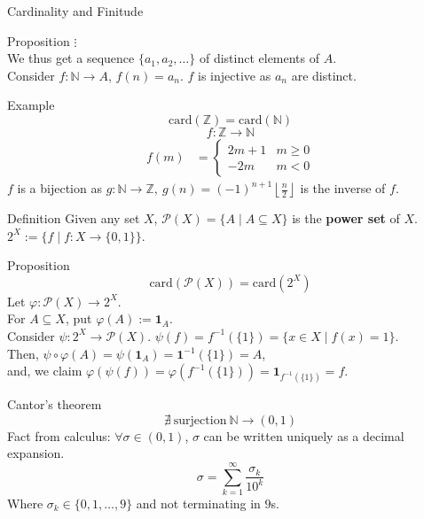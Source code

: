 \documentclass[8pt]{extarticle}
\begin{document}
\begin{problem}{Cardinality and Finitude}
\begin{problem}{Proposition}
      $\vdots$\\

      We thus get a sequence $\{a_1,a_2,\dots\}$ of distinct elements of $A$.\\

      Consider $f:\mathbb{N} \rightarrow A$, $f(n) = a_n$. $f$ is injective as $a_n$ are distinct.
    \end{problem}
    \begin{problem}{Example}
      \[
        \textrm{card}(\mathbb{Z}) = \textrm{card}(\mathbb{N})
      \] 
      \tcblower
      \[
        f:\mathbb{Z} \rightarrow \mathbb{N}
      \] 
      \begin{align*}
        f(m) &= \begin{cases}
          2m + 1 & m\geq 0\\
          -2m & m<0
        \end{cases}
      \end{align*}
      $f$ is a bijection as $g:\mathbb{N} \rightarrow \mathbb{Z},~g(n) = (-1)^{n+1}\left\lfloor \frac{n}{2}\right\rfloor$ is the inverse of $f$.
    \end{problem}
    \begin{problem}{Definition}
      Given any set $X$, $\mathcal{P}(X) = \{A \mid A\subseteq X\}$ is the \textbf{power set} of $X$.\\

      $2^X:= \{f\mid f:X\rightarrow \{0,1\}\}$.
    \end{problem}
    \begin{problem}{Proposition}
      \[
        \textrm{card}(\mathcal{P}(X)) = \textrm{card}(2^X)
      \] 
      \tcblower
      Let $\varphi: \mathcal{P}(X) \rightarrow 2^X$.\\

      For $A\subseteq X$, put $\varphi(A) := \mathbf{1}_A$.\\

      Consider $\psi: 2^X \rightarrow \mathcal{P}(X)$. $\psi(f) = f^{-1}(\{1\}) = \{x\in X \mid f(x) = 1\}$.\\

      Then, $\psi\circ\varphi(A) = \psi(\mathbf{1}_A) = \mathbf{1}^{-1}(\{1\}) = A$,\\

      and, we claim $\varphi(\psi(f)) = \varphi(f^{-1}(\{1\})) = \mathbf{1}_{f^{-1}(\{1\})} = f$.
    \end{problem}
    \begin{problem}{Cantor's theorem}
      \[
        \nexists~\textrm{surjection}~\mathbb{N}\rightarrow (0,1)
      \] 
      \tcblower
      Fact from calculus: $\forall \sigma\in (0,1)$, $\sigma$ can be written uniquely as a decimal expansion.
      \[
        \sigma = \sum_{k=1}^{\infty} \frac{\sigma_k}{10^k}
      \] 
      Where $\sigma_k\in \{0,1,\dots,9\}$ and not terminating in $9$s.\\


\end{problem}
\end{problem}
\end{document}
